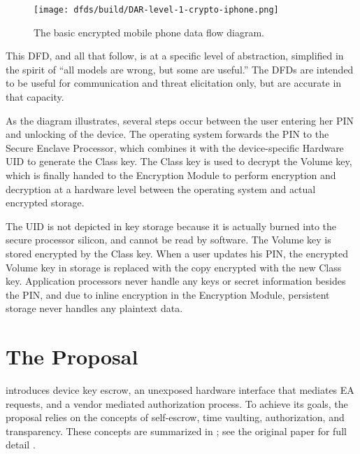 \begin{figure}[h]
    \centering\CaptionFontSize
    \texttt{[image: dfds/build/DAR-level-1-crypto-iphone.png]}
    \caption{The basic encrypted mobile phone data flow diagram.}
    \label{fig-dfd-iphone}
\end{figure}

This \ac{DFD}, and all that follow, is at a specific level of abstraction, simplified in the spirit of ``all models are
wrong, but some are useful.'' The \acp{DFD} are intended to be useful for communication and threat elicitation only, but
are accurate in that capacity.

As the diagram illustrates, several steps occur between the user entering her \ac{PIN} and unlocking of the device. The
operating system forwards the \ac{PIN} to the Secure Enclave Processor, which combines it with the device-specific
Hardware \ac{UID} to generate the Class key. The Class key is used to decrypt the Volume key, which is finally handed to
the Encryption Module to perform encryption and decryption at a hardware level between the operating system and actual
encrypted storage.

The \ac{UID} is not depicted in key storage because it is actually burned into the secure processor silicon, and cannot
be read by software. The Volume key is stored encrypted by the Class key. When a user updates his \ac{PIN}, the
encrypted Volume key in storage is replaced with the copy encrypted with the new Class key. Application processors never
handle any keys or secret information besides the \ac{PIN}, and due to inline encryption in the Encryption Module,
persistent storage never handles any \ac{plaintext} data.


\section{The \ldawmsr Proposal}

\ldawmsr introduces device key escrow, an unexposed hardware interface that mediates \ac{EA} requests, and a vendor
mediated authorization process. To achieve its goals, the proposal relies on the concepts of self-escrow, time vaulting,
authorization, and transparency. These concepts are summarized in ; see the original paper
for full detail \cite{savage_lawful_2018}.

